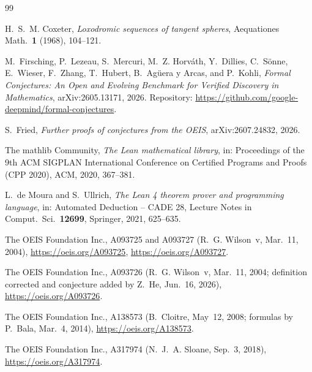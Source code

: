 \documentclass[11pt]{amsart}
\theoremstyle{plain}
\theoremstyle{definition}
\begin{document}
{\footnotesize\raggedright
\begin{thebibliography}{99}

H.~S.~M. Coxeter, \emph{Loxodromic sequences of tangent spheres}, Aequationes Math.\ \textbf{1} (1968), 104--121.

M.~Firsching, P.~Lezeau, S.~Mercuri, M.~Z. Horv\'ath, Y.~Dillies, C.~S\"onne, E.~Wieser, F.~Zhang, T.~Hubert, B.~Ag\"uera y Arcas, and P.~Kohli, \emph{Formal Conjectures: An Open and Evolving Benchmark for Verified Discovery in Mathematics}, arXiv:2605.13171, 2026. Repository: \url{https://github.com/google-deepmind/formal-conjectures}.

S.~Fried, \emph{Further proofs of conjectures from the OEIS}, arXiv:2607.24832, 2026.

The mathlib Community, \emph{The Lean mathematical library}, in: Proceedings of the 9th ACM SIGPLAN International Conference on Certified Programs and Proofs (CPP 2020), ACM, 2020, 367--381.

L.~de Moura and S.~Ullrich, \emph{The Lean 4 theorem prover and programming language}, in: Automated Deduction -- CADE 28, Lecture Notes in Comput.\ Sci.\ \textbf{12699}, Springer, 2021, 625--635.

The OEIS Foundation Inc., A093725 and A093727 (R.~G. Wilson~v, Mar.~11, 2004), \url{https://oeis.org/A093725}, \url{https://oeis.org/A093727}.

The OEIS Foundation Inc., A093726 (R.~G. Wilson~v, Mar.~11, 2004; definition corrected and conjecture added by Z.~He, Jun.~16, 2026), \url{https://oeis.org/A093726}.

The OEIS Foundation Inc., A138573 (B.~Cloitre, May~12, 2008; formulas by P.~Bala, Mar.~4, 2014), \url{https://oeis.org/A138573}.

The OEIS Foundation Inc., A317974 (N.~J.~A. Sloane, Sep.~3, 2018), \url{https://oeis.org/A317974}.

\end{thebibliography}
}
\end{document}
